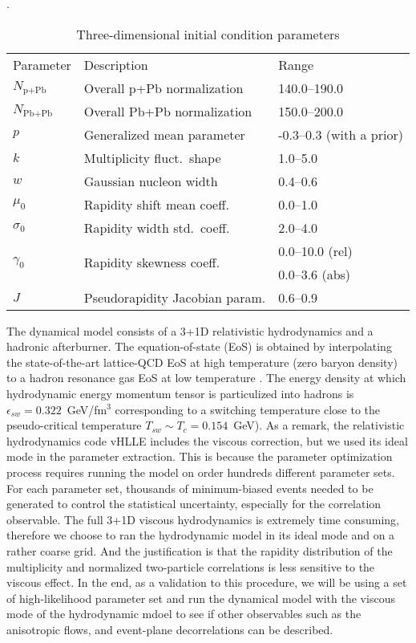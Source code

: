 \begin{table}
\centering
\caption{Three-dimensional initial condition parameters}
\label{tab:trento:parameters}.
\begin{tabular}{lll}
      Parameter & Description	& Range \\
      \paddedhline
      $N_{\textrm{p+Pb}}$    & Overall p+Pb normalization      & 140.0--190.0 \\
      $N_{\textrm{Pb+Pb}}$   & Overall Pb+Pb normalization     & 150.0--200.0  \\
      $p$	                   & Generalized mean parameter      & -0.3--0.3 (with a prior)  \\
      $k$	                   & Multiplicity fluct.\ shape      & 1.0--5.0  \\
      $w$	                   & Gaussian nucleon width     & 0.4--0.6  \\
      $\mu_0$                & Rapidity shift mean coeff.\     & 0.0--1.0  \\
      $\sigma_0$             & Rapidity width std.\ coeff.\    & 2.0--4.0  \\
      \multirow{2}{*}{$\gamma_0$}             & \multirow{2}{*}{Rapidity skewness coeff.\ }      & 0.0--10.0 (rel) \\
                  &        & 0.0--3.6 (abs)  \\
      $J$	                   & Pseudorapidity Jacobian param.  & 0.6--0.9
\end{tabular}  
\end{table}

The dynamical model consists of a 3+1D relativistic hydrodynamics and a hadronic afterburner.
The equation-of-state (EoS) is obtained by interpolating the state-of-the-art lattice-QCD EoS \cite{Bazavov:2014pvz} at high temperature (zero baryon density) to a hadron resonance gas EoS at low temperature \cite{Moreland:2015dvc}.
The energy density at which hydrodynamic energy momentum tensor is particulized into hadrons is $\epsilon_{sw} = 0.322$~GeV/fm$^3$ corresponding to a switching temperature close to the pseudo-critical temperature $T_{sw} \sim T_c = 0.154$~GeV).
As a remark, the relativistic hydrodynamics code vHLLE \cite{Karpenko:2013wva} includes the viscous correction, but we used its ideal mode in the parameter extraction.
This is because the parameter optimization process requires running the model on order hundreds different parameter sets.
For each parameter set, thousands of minimum-biased events needed to be generated to control the statistical uncertainty, especially for the correlation observable. 
The full 3+1D viscous hydrodynamics is extremely time consuming, therefore we choose to ran the hydrodynamic model in its ideal mode and on a rather coarse grid.
And the justification is that the rapidity distribution of the multiplicity and normalized two-particle correlations is less sensitive to the viscous effect.
In the end, as a validation to this procedure, we will be using a set of high-likelihood parameter set and run the dynamical model with the viscous mode of the hydrodynamic mdoel to see if other observables such as the anisotropic flows, and event-plane decorrelations can be described.

